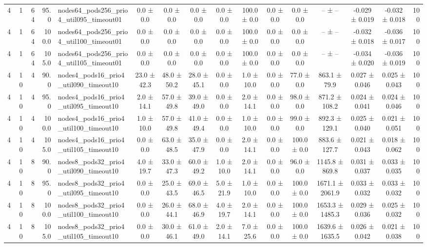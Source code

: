 \begin{tabular}{r r r r l c c c c c c c c c c r}
4 & 1 & 64 & 95.0 & nodes64\_pods256\_prio4\_util095\_timeout01 & 0.0 ± 0.0 & 0.0 ± 0.0 & 0.0 ± 0.0 & 0.0 ± 0.0 & 100.0 ± 0.0 & 0.0 ± 0.0 & 0.0 ± 0.0 & -- ± -- & -0.029 ± 0.019 & -0.032 ± 0.018 & 100 \\
4 & 1 & 64 & 100.0 & nodes64\_pods256\_prio4\_util100\_timeout01 & 0.0 ± 0.0 & 0.0 ± 0.0 & 0.0 ± 0.0 & 0.0 ± 0.0 & 100.0 ± 0.0 & 0.0 ± 0.0 & 0.0 ± 0.0 & -- ± -- & -0.032 ± 0.018 & -0.036 ± 0.017 & 100 \\
4 & 1 & 64 & 105.0 & nodes64\_pods256\_prio4\_util105\_timeout01 & 0.0 ± 0.0 & 0.0 ± 0.0 & 0.0 ± 0.0 & 0.0 ± 0.0 & 100.0 ± 0.0 & 0.0 ± 0.0 & 0.0 ± 0.0 & -- ± -- & -0.034 ± 0.020 & -0.036 ± 0.019 & 100 \\
4 & 10 & 4 & 90.0 & nodes4\_pods16\_prio4\_util090\_timeout10 & 23.0 ± 42.3 & 48.0 ± 50.2 & 28.0 ± 45.1 & 0.0 ± 0.0 & 1.0 ± 10.0 & 0.0 ± 0.0 & 77.0 ± 0.0 & 863.1 ± 79.9 & 0.027 ± 0.046 & 0.025 ± 0.043 & 100 \\
4 & 10 & 4 & 95.0 & nodes4\_pods16\_prio4\_util095\_timeout10 & 2.0 ± 14.1 & 57.0 ± 49.8 & 39.0 ± 49.0 & 0.0 ± 0.0 & 2.0 ± 14.1 & 0.0 ± 0.0 & 98.0 ± 0.0 & 871.2 ± 108.2 & 0.024 ± 0.041 & 0.024 ± 0.046 & 100 \\
4 & 10 & 4 & 100.0 & nodes4\_pods16\_prio4\_util100\_timeout10 & 1.0 ± 10.0 & 57.0 ± 49.8 & 41.0 ± 49.4 & 0.0 ± 0.0 & 1.0 ± 10.0 & 0.0 ± 0.0 & 99.0 ± 0.0 & 892.3 ± 129.1 & 0.025 ± 0.040 & 0.021 ± 0.051 & 100 \\
4 & 10 & 4 & 105.0 & nodes4\_pods16\_prio4\_util105\_timeout10 & 0.0 ± 0.0 & 63.0 ± 48.5 & 35.0 ± 47.9 & 0.0 ± 0.0 & 2.0 ± 14.1 & 0.0 ± 0.0 & 100.0 ± 0.0 & 883.6 ± 127.7 & 0.021 ± 0.043 & 0.018 ± 0.062 & 100 \\
4 & 10 & 8 & 90.0 & nodes8\_pods32\_prio4\_util090\_timeout10 & 4.0 ± 19.7 & 33.0 ± 47.3 & 60.0 ± 49.2 & 1.0 ± 10.0 & 2.0 ± 14.1 & 0.0 ± 0.0 & 96.0 ± 0.0 & 1145.8 ± 869.8 & 0.031 ± 0.037 & 0.033 ± 0.035 & 100 \\
4 & 10 & 8 & 95.0 & nodes8\_pods32\_prio4\_util095\_timeout10 & 0.0 ± 0.0 & 25.0 ± 43.5 & 69.0 ± 46.5 & 5.0 ± 21.9 & 1.0 ± 10.0 & 0.0 ± 0.0 & 100.0 ± 0.0 & 1671.1 ± 2061.9 & 0.033 ± 0.032 & 0.033 ± 0.032 & 100 \\
4 & 10 & 8 & 100.0 & nodes8\_pods32\_prio4\_util100\_timeout10 & 0.0 ± 0.0 & 26.0 ± 44.1 & 68.0 ± 46.9 & 4.0 ± 19.7 & 2.0 ± 14.1 & 0.0 ± 0.0 & 100.0 ± 0.0 & 1653.3 ± 1485.3 & 0.029 ± 0.036 & 0.025 ± 0.032 & 100 \\
4 & 10 & 8 & 105.0 & nodes8\_pods32\_prio4\_util105\_timeout10 & 0.0 ± 0.0 & 30.0 ± 46.1 & 61.0 ± 49.0 & 2.0 ± 14.1 & 7.0 ± 25.6 & 0.0 ± 0.0 & 100.0 ± 0.0 & 1639.6 ± 1635.5 & 0.026 ± 0.042 & 0.021 ± 0.038 & 100 \\

\end{tabular}
